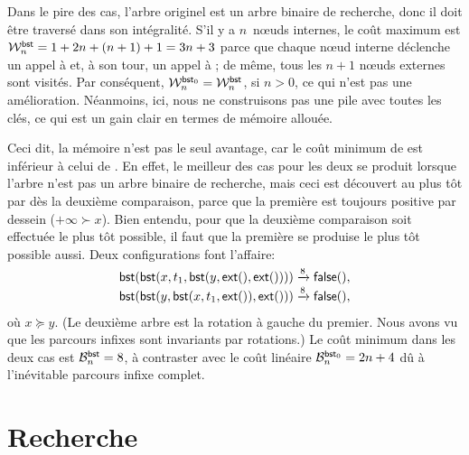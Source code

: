 Dans le pire des cas, l'arbre originel est un arbre binaire de
recherche, donc il doit être traversé dans son intégralité. S'il y a
\(n\)~n{\oe}uds internes, le coût maximum est \(\W{\fun{bst}}{n} = 1 +
2n + (n+1) + 1 = 3n + 3\) parce que
chaque n{\oe}ud interne déclenche un appel à
 et, à son tour, un
appel à ; de même, tous les \(n+1\)
n{\oe}uds externes sont visités. Par conséquent, \(\W{\fun{bst}_0}{n}
= \W{\fun{bst}}{n}\), si \(n > 0\),
ce qui n'est pas une amélioration. Néanmoins, ici, nous ne
construisons pas une pile avec toutes les clés, ce qui est un gain
clair en termes de mémoire allouée.

Ceci dit, la mémoire n'est pas le seul avantage, car le coût minimum
de  est inférieur à celui de
. En effet, le meilleur
des cas pour les deux se produit lorsque l'arbre n'est pas un arbre
binaire de recherche, mais ceci est découvert au plus tôt par
 dès la deuxième comparaison, parce que la première est
toujours positive par dessein (\(+\infty \succ x\)). Bien entendu,
pour que la deuxième comparaison soit effectuée le plus tôt possible,
il faut que la première se produise le plus tôt possible aussi. Deux
configurations font l'affaire:
\begin{align*}
\fun{bst}(\fun{bst}(x,t_1,\fun{bst}(y,\fun{ext}(),\fun{ext}())))
& \xrightarrow{\smash{8}} \fun{false}(),\\
\fun{bst}(\fun{bst}(y,\fun{bst}(x,t_1,\fun{ext}()),\fun{ext}()))
& \xrightarrow{\smash{8}} \fun{false}(),
\end{align*}
où \(x \succcurlyeq y\). (Le deuxième arbre est la rotation à gauche
du premier. Nous avons vu  que les parcours
infixes sont invariants par rotations.) Le coût minimum dans les deux
cas est \(\B{\fun{bst}}{n} = 8\), à
contraster avec le coût linéaire \(\B{\fun{bst}_0}{n} = 2n +
4\) dû à l'inévitable parcours infixe
complet.

\section{Recherche}

